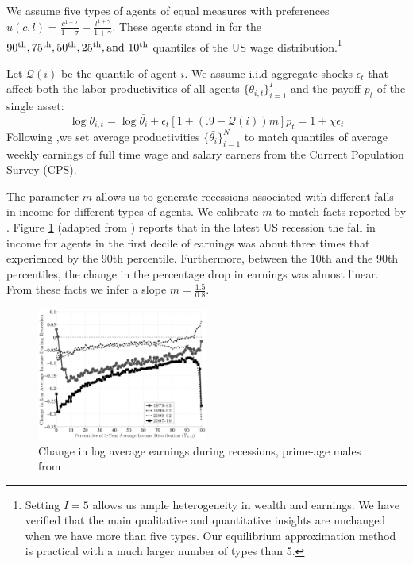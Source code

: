 \documentclass[thmsb,11pt]{article}
\begin{document}
We assume  five types of agents of equal measures with preferences $u(c,l)=\frac{c^{1-\sigma}}{1-\sigma}-\frac{l^{1+\gamma}}{1+\gamma}$.
These agents stand in for  the $90\textsuperscript{th},75\textsuperscript{th},50\textsuperscript{th},25\textsuperscript{th},  \text{and } 10\textsuperscript{th}$ quantiles
of the  US wage distribution.\footnote{Setting  $I=5$ allows us ample heterogeneity in wealth and earnings. We have verified that the main qualitative and quantitative insights are unchanged when  we
have more than five types.
Our equilibrium approximation method is practical with a much larger  number of types than 5. }

Let $\mathcal{Q}(i)$ be the quantile of agent $i$. We assume i.i.d aggregate shocks $\epsilon_t$ that affect both the labor productivities of all agents $\{\theta_{i,t}\}^{I}_{i=1}$ and the  payoff $p_t$ of the single asset:
\begin{subequations}
\begin{equation} \label{wage equation calibration}
 \log \theta_{i,t}=\log\bar{\theta_i}+ \epsilon_t[1+(.9-\mathcal{Q}(i))m]
\end{equation}
 \begin{equation}
p_t=1+\chi \epsilon_t
 \end{equation}

\end{subequations}
Following \cite{Autor2008},we set average productivities $\{\bar{\theta_i}\}^{N}_{i=1}$  to match
quantiles of  average weekly earnings of full time wage and salary earners from the Current Population Survey (CPS).

The parameter $m$ allows us to generate recessions associated with different  falls in income for different types of agents.
We calibrate $m$ to match  facts reported by \citet{Fatih2014}.
Figure \ref{fig:fatih_picture} (adapted from \citeauthor{Fatih2014}) reports that in the latest US recession the fall in income for  agents in the first decile of earnings was about  three times
that experienced by the 90th percentile. Furthermore, between the 10th and the 90th  percentiles, the change in the percentage drop in earnings was almost linear.
From these facts we infer a slope  $m=\frac{1.5}{0.8}$.

 {
  \begin{figure}
  \label{fig:fatih_picture}
    \centering
    \includegraphics[width = 0.5\textwidth]{fg13.jpeg}
    \caption{ Change in log average earnings during recessions, prime-age males from \cite{Fatih2014}}
  \end{figure}

}
\end{document}
